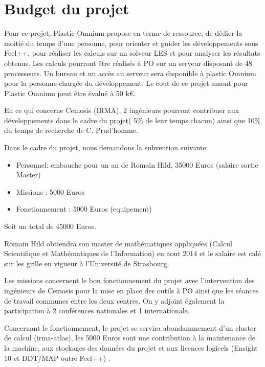 \documentclass{article}
\begin{document}
\section{Budget du projet}
\label{sec:budget}

Pour ce projet, Plastic Omnium propose en terme de ressource, de dédier la
moitié du temps d’une personne, pour orienter et guider les développements sous
Feel++, pour réaliser les calculs sur un solveur LES et pour analyser les
résultats obtenus. Les calculs pourront être réalisés à PO sur un serveur
disposant de 48 processeurs. Un bureau et un accès au serveur sera disponible à
plastic Omnium pour la personne chargée du développement. Le cout de ce projet
amont pour Plastic Omnium peut être évalué à 50 k€.

En ce qui concerne Cemosis (IRMA), 2 ingénieurs pourront contribuer aux
développements dans le cadre du projet( 5\% de leur temps chacun) ainsi que 10\%
du temps de recherche de C. Prud'homme.

Dans le cadre du projet, nous demandons la subvention suivante:
\begin{itemize}
\item Personnel: embauche pour un an de Romain Hild, 35000 Euros (salaire sortie Master)
\item Missions : 5000 Euros
\item Fonctionnement  : 5000 Euros (equipement)
\end{itemize}
Soit un total de 45000 Euros.

Romain Hild obtiendra son master de mathématiques appliquées (Calcul
Scientifique et Mathématiques de l'Information) en aout 2014 et le salaire est
calé sur les grille en vigueur à l'Université de Strasbourg.

Les missions concernent le bon fonctionnement du projet avec l'intervention des
ingénieurs de Cemosis pour la mise en place des outils à PO ainsi que les
séances de travail communes entre les deux centres. On y adjoint également la
participation à 2 conférences nationales et 1 internationale.

Concernant le fonctionnement, le projet se servira abondammement d'un cluster de
calcul (irma-atlas), les 5000 Euros sont une contribution à la maintenance de la
machine, aux stockages des données du projet et aux licences logicels (Ensight
10 et DDT/MAP outre Feel++) .




\end{document}
